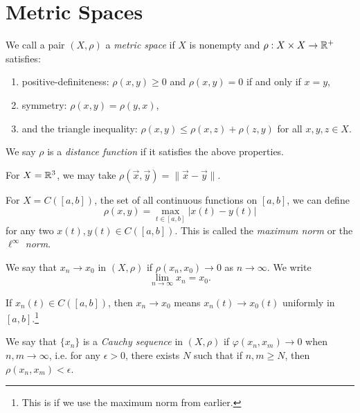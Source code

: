 \section{Metric Spaces}

\begin{definition}
  We call a pair $(X, \rho)$ a \emph{metric space} if
  $X$ is nonempty and
  $\rho : X \times X \to \mathbb{R}^+$
  satisfies:
  \begin{enumerate}
    \item positive-definiteness: $\rho(x, y) \ge 0$ and $\rho(x, y) = 0$
      if and only if $x = y$,
    \item symmetry: $\rho(x, y) = \rho(y, x)$,
    \item and the triangle inequality: $\rho(x, y) \le \rho(x, z) + \rho(z, y)$ for
      all $x, y, z \in X$.
  \end{enumerate}
  We say $\rho$ is a \emph{distance function} if it
  satisfies the above properties.
\end{definition}

\begin{example}
  For $X = \mathbb{R}^3$, we may take
  $\rho(\vec{x}, \vec{y}) = \|\vec{x} - \vec{y}\|$.
\end{example}

\begin{example}
  For $X = C([a, b])$, the set of all
  continuous functions on $[a, b]$, we can define
  \[
    \rho(x, y) = \max_{t \in [a, b]} |x(t) - y(t)|
  \]
  for any two $x(t), y(t) \in C([a, b])$.
  This is called the \emph{maximum norm} or
  the $\ell^\infty$ \emph{norm}.
\end{example}

\begin{definition}[Convergence]
  We say that $x_n \to x_0$ in $(X, \rho)$ if
  $\rho(x_n, x_0) \to 0$ as $n \to \infty$. We write
  \[
    \lim_{n \to \infty} x_n = x_0.
  \]
\end{definition}

\begin{example}
  If $x_n(t) \in C([a, b])$, then $x_n \to x_0$
  means $x_n(t) \to x_0(t)$ uniformly in $[a, b]$.\footnote{This is if we use the maximum norm from earlier.}
\end{example}

\begin{definition}
  We say that $\{x_n\}$ is a \emph{Cauchy sequence} in
  $(X, \rho)$ if $\varphi(x_n, x_m) \to 0$
  when $n, m \to \infty$, i.e. for any $\epsilon > 0$,
  there exists $N$ such that if $n, m \ge N$, then
  $\rho(x_n, x_m) < \epsilon$.
\end{definition}

